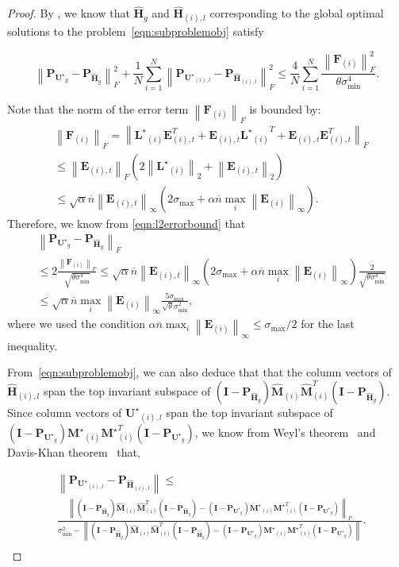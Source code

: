 \documentclass[twoside,11pt]{article}
\newcommand{\norm}[1]{\left\lVert#1\right\rVert}
\newcommand{\matE}{\mathbf{E}}
\newcommand{\matF}{\mathbf{F}}
\newcommand{\hmatH}{{\hat{\mathbf{H}}}{}}
\newcommand{\matI}{\mathbf{I}}
\newcommand{\matLst}{{\mathbf{L}^\star}}
\newcommand{\matMst}{{\mathbf{M}^\star}}
\newcommand{\matP}{\mathbf{P}}
\newcommand{\matUst}{{\mathbf{U}^\star}}
\newcommand{\hmatM}{\hat{\mathbf{M}}}
\newcommand{\gop}{\sigma_{\max}}
\newcommand{\bn}{{\overline{n}}}
\newcommand{\abnb}{\alpha \bn\max_{i}\norm{\matE_{(i)}}_{\infty}}
\newcommand{\sabnb}{\sqrt{\alpha} \bn\max_{i}\norm{\matE_{(i)}}_{\infty}}
\newcommand{\sms}{\sigma_{\min}^2}
\newcommand{\smq}{\sigma_{\min}^4}
\begin{document}
\begin{proof}
 
By \citet[Theorem 1]{personalizedpca}, we know that $\hmatH_g$ and $\hmatH_{(i),l}$ corresponding to the global optimal solutions to the problem~\eqref{eqn:subproblemobj} satisfy

\begin{equation}
\label{eqn:l2errorbound}
\norm{\matP_{\matUst_g}-\matP_{\hmatH_g}}_F^2+\frac{1}{N}\sum_{i=1}^N\norm{\matP_{\matUst_{(i),l}}-\matP_{\hmatH_{(i),l}}}_F^2\le \frac{4}{N}\sum_{i=1}^N\frac{\norm{\matF_{(i)}}_F^2}{\theta\smq}.
\end{equation}

Note that the norm of the error term $\norm{\matF_{(i)}}_F$ is bounded by:
\begin{equation}
\label{eqn:ffnormbound}
\begin{aligned}
&\norm{\matF_{(i)}}_F=\norm{\matLst_{(i)}\matE_{(i),t}^T+\matE_{(i),t}{\matLst_{(i)}}^T+\matE_{(i),t}\matE_{(i),t}^T}_F\\
&\le \norm{\matE_{(i),t}}_F\left(2\norm{\matLst_{(i)}}_{2}+\norm{\matE_{(i),t}}_2\right)\\
&\le \sqrt{\alpha}\bn\norm{\matE_{(i),t}}_{\infty}\left(2\gop+\abnb\right).
\end{aligned}
\end{equation}
Therefore, we know from \eqref{eqn:l2errorbound} that
\begin{align*}
&\norm{\matP_{\matUst_g}-\matP_{\hmatH_g}}_F\\
&\le 2\frac{\norm{\matF_{(i)}}_F}{\sqrt{\theta\smq}}\le \sqrt{\alpha}\bn\norm{\matE_{(i),t}}_{\infty}\left(2\gop+\abnb\right)\frac{2}{\sqrt{\theta\smq}}\\
&\le \sabnb\frac{5\gop}{\sqrt{\theta}\sms}, 
\end{align*}
where we used the condition $\abnb \le \gop/2$ for the last inequality.

From~\eqref{eqn:subproblemobj}, we can also deduce that that the column vectors of $\hmatH_{(i),l}$ span the top invariant subspace of $\left(\matI-\matP_{\hmatH_g}\right)\hmatM_{(i)}\hmatM_{(i)}^T \left(\matI-\matP_{\hmatH_g}\right)$. Since column vectors of $\matUst_{(i),l}$ span the top invariant subspace of $\left(\matI-\matP_{\matUst_g}\right)\matMst_{(i)}\matMst_{(i)}^T \left(\matI-\matP_{\matUst_g}\right)$, we know from Weyl's theorem~\citep{taoblog} and Davis-Khan theorem~\citep{cmuslides} that,

\begin{align*}
&\norm{\matP_{\matUst_{(i),l}}-\matP_{\hmatH_{(i),l}}}\le\\
&\frac{\norm{\left(\matI-\matP_{\hmatH_g}\right)\hmatM_{(i)}\hmatM_{(i)}^T \left(\matI-\matP_{\hmatH_g}\right)-\left(\matI-\matP_{\matUst_g}\right)\matMst_{(i)}\matMst_{(i)}^T \left(\matI-\matP_{\matUst_g}\right)}_F}{\sms - \norm{\left(\matI-\matP_{\hmatH_g}\right)\hmatM_{(i)}\hmatM_{(i)}^T \left(\matI-\matP_{\hmatH_g}\right)-\left(\matI-\matP_{\matUst_g}\right)\matMst_{(i)}\matMst_{(i)}^T \left(\matI-\matP_{\matUst_g}\right)}}. \\
\end{align*}


\end{proof}
\end{document}
